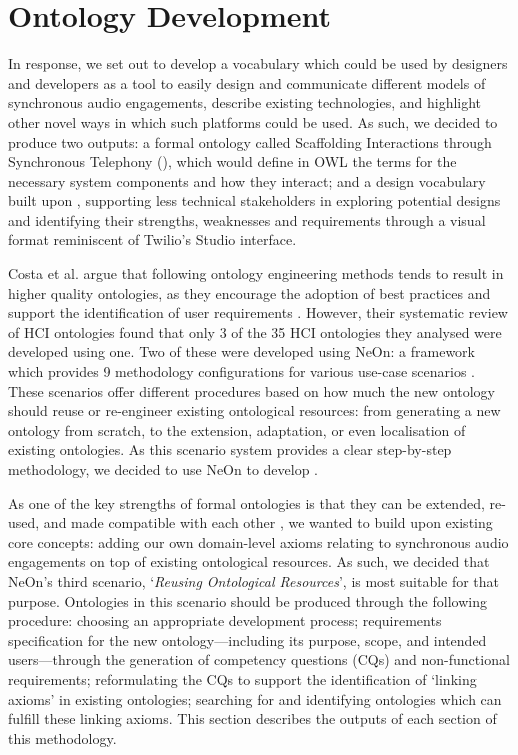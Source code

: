 \section{Ontology Development}

In response, we set out to develop a vocabulary which could be used by designers and developers as a tool to easily design and communicate different models of synchronous audio engagements, describe existing technologies, and highlight other novel ways in which such platforms could be used. As such, we decided to produce two outputs: a formal ontology called Scaffolding Interactions through Synchronous Telephony (\ONT{}), which would define in OWL the terms for the necessary system components and how they interact; and a design vocabulary built upon \ONT{}, supporting less technical stakeholders in exploring potential designs and identifying their strengths, weaknesses and requirements through a visual format reminiscent of Twilio's Studio interface.

Costa et al. argue that following ontology engineering methods tends to result in higher quality ontologies, as they encourage the adoption of best practices and support the identification of user requirements \cite{costa2021}. However, their systematic review of HCI ontologies found that only 3 of the 35 HCI ontologies they analysed were developed using one. Two of these were developed using NeOn: a framework which provides 9 methodology configurations for various use-case scenarios \cite{gomez2009, suarez2012}. These scenarios offer different procedures based on how much the new ontology should reuse or re-engineer existing ontological resources: from generating a new ontology from scratch, to the extension, adaptation, or even localisation of existing ontologies. As this scenario system provides a clear step-by-step methodology, we decided to use NeOn to develop \ONT{}.

As one of the key strengths of formal ontologies is that they can be extended, re-used, and made compatible with each other \cite{scherp2011}, we wanted to build upon existing core concepts: adding our own domain-level axioms relating to synchronous audio engagements on top of existing ontological resources. As such, we decided that NeOn's third scenario, `\textit{Reusing Ontological Resources}', is most suitable for that purpose. Ontologies in this scenario \cite{suarez2012_reuse} should be produced through the following procedure: choosing an appropriate development process; requirements specification for the new ontology---including its purpose, scope, and intended users---through the generation of competency questions (CQs) and non-functional requirements; reformulating the CQs to support the identification of `linking axioms' in existing ontologies; searching for and identifying ontologies which can fulfill these linking axioms. This section describes the outputs of each section of this methodology.

